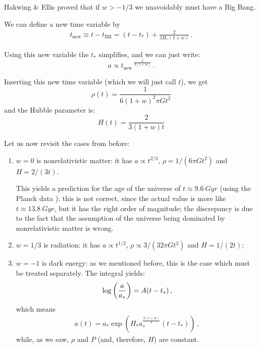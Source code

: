 \documentclass[main.tex]{subfiles}
\begin{document}
Hakwing \& Ellis proved that if \(w>-1/3\) we unavoidably must have a Big Bang.

We can define a new time variable by 
%
\begin{align}
t_{\text{new}} \equiv t-t _{\text{BB}} =  (t - t_{*}) 
+ \frac{2}{3 H_{*} (1+w)}
\,.
\end{align}

Using this new variable the \(t_{*}\) simplifies, and we can just write:
\begin{equation}
a \propto t_{\text{new}}\,^{\frac{2}{3(1+w)}}
\,.
\end{equation}

Inserting this new time variable (which we will just call \(t\)), we get
\begin{equation}
  \rho(t) = \frac{1}{6 (1+w)^2 \pi G t^2}
\end{equation}
and the Hubble parameter is:
\begin{equation}
  H(t) = \frac{2}{3(1+w) t}
\end{equation}

Let us now revisit the cases from before: 
\begin{enumerate}
  \item \(w=0\) is nonrelativistic matter: it has \(a \propto t^{2/3}\), \(\rho = 1 / (6 \pi G t^2)\) and \(H = 2/ (3t)\). 
  
  This yields a prediction for the age of the universe of \(t \approx \SI{9.6}{Gyr}\) (using the Planck data \cite{PlanckCollaboration:2016XIII}): this is not correct, since the actual value is more like \(t \approx \SI{13.8}{Gyr}\), but it has the right order of magnitude; the discrepancy is due to the fact that the assumption of the universe being dominated by nonrelativistic matter is wrong. 
  \item \(w=1/3\) is radiation: it has \(a \propto t^{1/2}\), \(\rho \propto 3/ (32 \pi G t^2)\) and \(H = 1/ (2t)\);
  \item \(w=-1\) is dark energy: as we mentioned before, this is the case which must be treated separately. The integral yields: 
  \begin{align}
  \log \qty(\frac{a}{a_{*}}) = A (t-t_{*})
  \,,
  \end{align}
  which means 
  \begin{align}
  a (t) = a_{*} \exp(H_{*} a_{*}^{\frac{3 (1+w)}{2}} (t - t_{*}))
  \,,
  \end{align}
  while, as we saw, \(\rho \) and \(P\) (and, therefore, \(H\)) are constant. 
\end{enumerate}
\end{document}
